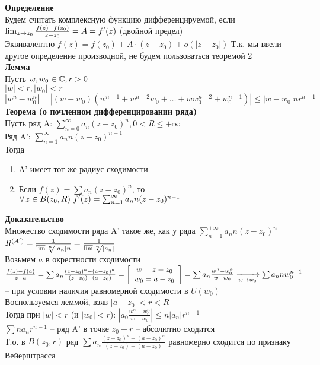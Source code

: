 \documentclass[12pt]{article}
\begin{document}
\textbf{Определение}\\
Будем считать комплексную функцию дифференцируемой, если $\lim_{z\rightarrow z_0} \frac{f(z)-f(z_0)}{z-z_0} = A = f'(z)$ (двойной предел)\\
Эквивалентно $f(z)=f(z_0) + A\cdot (z-z_0) + o(|z-z_0|)$
Т.к. мы ввели другое определение производной, не будем пользоваться теоремой 2\\
\textbf{Лемма}\\
Пусть $w, w_0 \in \mathbb{C}, r > 0$\\
$|w| < r, |w_0| < r$\\
$|w^n-w_0^n| = |(w-w_0)(w^{n-1} + w^{n-2}w_0 + \ldots + ww_0^{n-2}+w_0^{n-1})|\leq |w-w_0|nr^{n-1}$\\
\textbf{Теорема (о почленном дифференцировании ряда)}\\
Пусть ряд A: $\sum_{n=0}^{\infty} a_n(z-z_0)^n, 0 < R \leq +\infty$\\
Ряд A': $\sum_{n=1}^{\infty} a_n n (z-z_0)^{n-1}$\\
Тогда\begin{enumerate}
    \item A' имеет тот же радиус сходимости
    \item Если $f(z) = \sum a_n (z-z_0)^n$, то $\fall z \in B(z_0, R)\ f'(z)=\sum_{n=1}^\infty a_n n (z-z_0)^{n-1}$
\end{enumerate}
\textbf{Доказательство}\\
Множество сходимости ряда A' такое же, как у ряда $\sum_{n=1}^{+\infty} a_nn(z-z_0)^n$\\
$R^{(A')} = \frac1{\operatorname*{\overline{lim}} \sqrt[n]{|a_n|n}} = \frac1{\operatorname*{\overline{lim}} \sqrt[n]{|a_n|}}$\\
Возьмем $a$ в окрестности сходимости\\
$\frac{f(z)-f(a)}{z-a} = \sum a_n\frac{(z-z_0)^n-(a-z_0)^n}{(z-z_0)-(a-z_0)} = \left[\begin{array}{cc}
    w=z-z_0\\
    w_0 = a-z_0
\end{array}\right] = \sum a_n \frac{w^n-w_0^n}{w-w_0} \xrightarrow[w\rightarrow w_0]{} \sum a_nnw_0^{n-1}$ -- при условии наличия равномерной сходимости в $U(w_0)$\\
Воспользуемся леммой, взяв $|a-z_0| < r < R$\\
Тогда при $|w| < r$ (и $|w_0| < r$): $|a_0 \frac{w^n-w_0^n}{w-w_0}| \leq n |a_n|r^{n-1}$\\
$\sum na_nr^{n-1}$ -- ряд A' в точке $z_0+r$ -- абсолютно сходится\\
Т.о. в $B(z_0, r)$ ряд $\sum a_n\frac{(z-z_0)^n-(a-z_0)^n}{(z-z_0)-(a-z_0)}$ равномерно сходится по признаку Вейерштрасса\\
\end{document}
